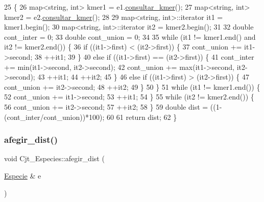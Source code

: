 \begin{DoxyCode}
25 \{
26     map<string, int> kmer1 = e1.\hyperlink{class_especie_a83ba0eee5730ca54986b741e982f1a07}{consultar\_kmer}();
27     map<string, int> kmer2 = e2.\hyperlink{class_especie_a83ba0eee5730ca54986b741e982f1a07}{consultar\_kmer}();
28 
29     map<string, int>::iterator it1 = kmer1.begin();
30     map<string, int>::iterator it2 = kmer2.begin();
31 
32     \textcolor{keywordtype}{double} cont\_inter = 0;
33     \textcolor{keywordtype}{double} cont\_union = 0;
34 
35     \textcolor{keywordflow}{while} (it1 != kmer1.end() and it2 != kmer2.end()) \{
36         \textcolor{keywordflow}{if} ((it1->first) < (it2->first)) \{
37             cont\_union += it1->second; 
38             ++it1;
39         \}
40         \textcolor{keywordflow}{else} \textcolor{keywordflow}{if} ((it1->first) == (it2->first)) \{
41             cont\_inter += min(it1->second, it2->second);
42             cont\_union += max(it1->second, it2->second); 
43             ++it1;
44             ++it2;
45         \}
46         \textcolor{keywordflow}{else} \textcolor{keywordflow}{if} ((it1->first) > (it2->first)) \{
47             cont\_union += it2->second;
48             ++it2;
49         \}
50     \}
51     \textcolor{keywordflow}{while} (it1 != kmer1.end()) \{
52         cont\_union += it1->second;
53         ++it1;
54     \}
55     \textcolor{keywordflow}{while} (it2 != kmer2.end()) \{
56         cont\_union += it2->second;
57         ++it2;
58     \}
59     \textcolor{keywordtype}{double} dist = ((1-(cont\_inter/cont\_union))*100);
60 
61     \textcolor{keywordflow}{return} dist;
62 \}
\end{DoxyCode}
\mbox{\label{class_cjt___especies_afc5f0e3bb5b236081ba71afc3f94df96}} 
\subsubsection{\texorpdfstring{afegir\+\_\+dist()}{afegir\_dist()}}
{\footnotesize\ttfamily void Cjt\+\_\+\+Especies\+::afegir\+\_\+dist (\begin{DoxyParamCaption}\item[{\hyperlink{class_especie}{Especie} \&}]{e }\end{DoxyParamCaption})}



